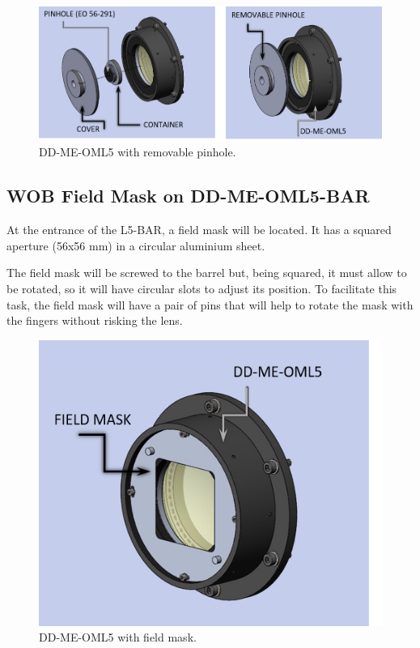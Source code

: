 \documentclass{report}
\begin{document}
\begin{figure}
\begin{center}
\includegraphics[width=1.1\linewidth]{figures/DD-ME-OML5-PH_VEx.png}
\end{center}
\caption{DD-ME-OML5 with removable pinhole.}
\label{figure:WOB-L5-PH}
\end{figure}

\subsection{WOB Field Mask on DD-ME-OML5-BAR}

At the entrance of the L5-BAR, a field mask will be located. It has a squared aperture (56x56 mm) in a circular aluminium sheet. 

The field mask will be screwed to the barrel but, being squared, it must allow to be rotated, so it will have circular slots to adjust its position. To facilitate this task, the field mask will have a pair of pins that will help to rotate the mask with the fingers without risking the lens.

\begin{figure}
\begin{center}
\includegraphics[width=0.7\linewidth]{figures/DD-ME-OML5-FMSK.png}
\end{center}
\caption{DD-ME-OML5 with field mask.}
\label{figure:WOB-L5-FM}
\end{figure}
\end{document}
